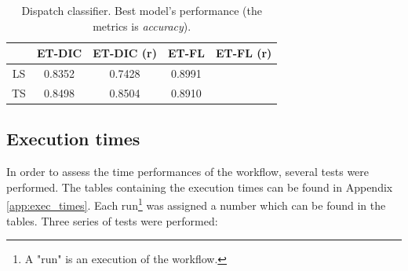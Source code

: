 \begin{table}
	\small
	\center
	\caption{Dispatch classifier. Dataset size.}
	\label{tab:dispatch_classif_dataset_size}
\end{table}

\begin{table}
	\small
	\center 
	\begin{tabular}{|c|cc|cc|}
		\hline
		& ET-DIC & ET-DIC (r) & ET-FL & ET-FL (r) \\
		\hline
		LS & 0.8352 & 0.7428 & 0.8991 & \\
		TS & 0.8498 & 0.8504 & 0.8910 & \\
		\hline
	\end{tabular}
	\caption{Dispatch classifier. Best model's performance (the metrics is \textit{accuracy}).}
	\label{tab:dispatch_classif_best_scores}
\end{table}

\subsection{Execution times}
\label{ssec:perf_exec_times}
In order to assess the time performances of the workflow, several tests were performed. The tables containing the execution times can be found in Appendix \ref{app:exec_times}. Each run\footnote{A "run" is an execution of the workflow.} was assigned a number which can be found in the tables. Three series of tests were performed:

